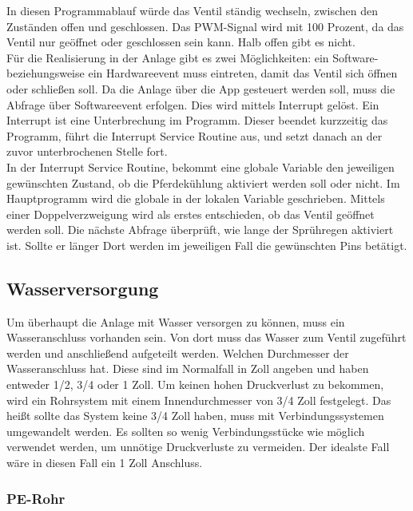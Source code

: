 In diesen Programmablauf würde das Ventil ständig wechseln, zwischen den Zuständen offen und geschlossen. Das PWM-Signal wird mit 100 Prozent, da das Ventil nur geöffnet oder geschlossen sein kann. Halb offen gibt es nicht. \\
Für die Realisierung in der Anlage gibt es zwei Möglichkeiten: ein Software- beziehungsweise ein Hardwareevent muss eintreten, damit das Ventil sich öffnen oder schließen soll. Da die Anlage über die App gesteuert werden soll, muss die Abfrage über Softwareevent erfolgen. Dies wird mittels Interrupt gelöst. Ein Interrupt ist eine Unterbrechung im Programm. Dieser beendet kurzzeitig das Programm, führt die Interrupt Service Routine aus, und setzt danach an der zuvor unterbrochenen Stelle fort. \\ In der Interrupt Service Routine, bekommt eine globale Variable den jeweiligen gewünschten Zustand, ob die Pferdekühlung aktiviert werden soll oder nicht. Im Hauptprogramm wird die globale in der lokalen Variable geschrieben. Mittels einer Doppelverzweigung wird als erstes entschieden, ob das Ventil geöffnet werden soll. Die nächste Abfrage überprüft, wie lange der Sprühregen aktiviert ist. Sollte er länger  Dort werden im jeweiligen Fall die gewünschten Pins betätigt.

\subsection{Wasserversorgung}
\label{sec:wasserversorgung}

Um überhaupt die Anlage mit Wasser versorgen zu können, muss ein Wasseranschluss vorhanden sein. Von dort muss das Wasser zum Ventil zugeführt werden und anschließend aufgeteilt werden. Welchen Durchmesser der Wasseranschluss hat. Diese sind im Normalfall in Zoll angeben und haben entweder 1/2, 3/4 oder 1 Zoll. Um keinen hohen Druckverlust zu bekommen, wird ein Rohrsystem mit einem Innendurchmesser von 3/4 Zoll festgelegt. Das heißt sollte das System keine 3/4 Zoll haben, muss mit Verbindungssystemen umgewandelt werden. Es sollten so wenig Verbindungsstücke wie möglich verwendet werden, um unnötige Druckverluste zu vermeiden. Der idealste Fall wäre in diesen Fall ein 1 Zoll Anschluss. \\ 


\subsubsection{PE-Rohr}
\label{sec:peRohr}

